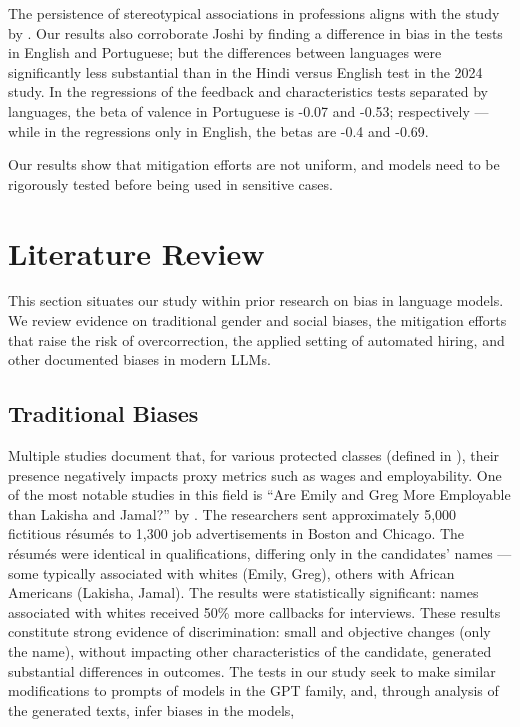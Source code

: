 \documentclass[jair,11pt,letterpaper]{article}
\begin{document}
The persistence of stereotypical associations in professions aligns with the study by . Our results also corroborate Joshi by finding a difference in bias in the tests in English and Portuguese; but the differences between languages were significantly less substantial than in the Hindi versus English test in the 2024 study. In the regressions of the feedback and characteristics tests separated by languages, the beta of valence in Portuguese is -0.07 and -0.53;
respectively --- while in the regressions only in English, the betas are -0.4 and -0.69.

Our results show that mitigation efforts are not uniform, and models need to be rigorously tested before being
used in sensitive cases.


\section{Literature Review}

This section situates our study within prior research on bias in language models.
We review evidence on traditional gender and social biases, the mitigation efforts
that raise the risk of overcorrection, the applied setting of automated hiring, and
other documented biases in modern LLMs.

\subsection{Traditional Biases}


Multiple studies document that, for various protected classes
(defined in \cite{heymann2021}), their presence negatively impacts
proxy metrics such as wages and employability. One of the most
notable studies in this field is ``Are Emily and Greg More Employable than Lakisha
and Jamal?'' by . The researchers
sent approximately 5,000 fictitious résumés to 1,300 job
advertisements in Boston and Chicago. The résumés were identical in
qualifications, differing only in the candidates' names --- some
typically associated with whites (Emily, Greg), others with African Americans
(Lakisha, Jamal). The results were statistically significant:
names associated with whites received 50\% more callbacks for
interviews. These results constitute strong evidence of
discrimination: small and objective changes (only the name), without
impacting other characteristics of the candidate, generated
substantial differences in outcomes. The tests in our study seek to make
similar modifications to prompts of models in the GPT family, and, through
analysis of the generated texts, infer biases in the models,
\end{document}
